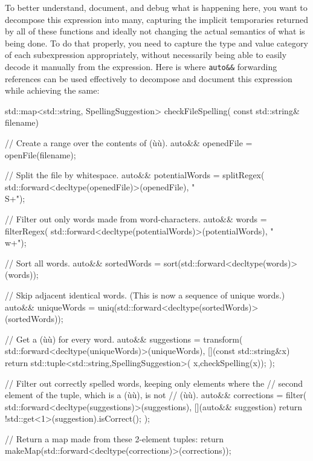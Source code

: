 To better understand, document, and debug what is happening
here, you want to decompose this expression into many, capturing the
implicit temporaries returned by all of these functions and ideally not
changing the actual semantics of what is being done. To do that
properly, you need to capture the type and value category of each
subexpression appropriately, without necessarily being able to easily
decode it manually from the expression. Here is where \lstinline!auto&&!
forwarding references can be used effectively to decompose and document
this expression while achieving the same:

\begin{emcppslisting}[emcppsbatch=e14]
std::map<std::string, SpellingSuggestion> checkFileSpelling(
                                                   const std::string& filename)
{
    // Create a range over the contents of (ù{}ù).
    auto&& openedFile = openFile(filename);

    // Split the file by whitespace.
    auto&& potentialWords = splitRegex(
        std::forward<decltype(openedFile)>(openedFile), "\\S+");

    // Filter out only words made from word-characters.
    auto&& words = filterRegex(
        std::forward<decltype(potentialWords)>(potentialWords), "\\w+");

    // Sort all words.
    auto&& sortedWords = sort(std::forward<decltype(words)>(words));

    // Skip adjacent identical words. (This is now a sequence of unique words.)
    auto&& uniqueWords = uniq(std::forward<decltype(sortedWords)>(sortedWords));

    // Get a (ù{}ù) for every word.
    auto&& suggestions = transform(
        std::forward<decltype(uniqueWords)>(uniqueWords),
        [](const std::string&x) {
            return std::tuple<std::string,SpellingSuggestion>(
                x,checkSpelling(x));
        });

    // Filter out correctly spelled words, keeping only elements where the
    // second element of the tuple, which is a (ù{}ù), is not
    // (ù{}ù).
    auto&& corrections = filter(
        std::forward<decltype(suggestions)>(suggestions),
        [](auto&& suggestion){ return !std::get<1>(suggestion).isCorrect(); });

    // Return a map made from these 2-element tuples:
    return makeMap(std::forward<decltype(corrections)>(corrections));
}
\end{emcppslisting}

